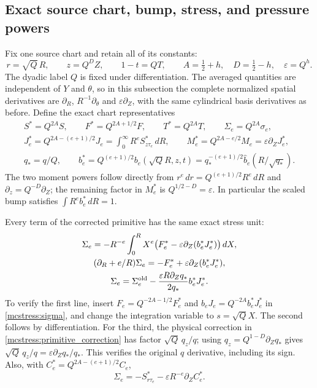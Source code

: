 \documentclass[11pt]{article}
\begin{document}
\subsection{Exact source chart, bump, stress, and pressure powers}

Fix one source chart and retain all of its constants:
\begin{equation}\label{mcstress:chart}
 r=\sqrt Q\,R,\qquad z=Q^D Z,\qquad1-t=QT,
 \qquad A=\tfrac12+h,\quad D=\tfrac12-h,\quad
 \varepsilon=Q^h.
\end{equation}
The dyadic label $Q$ is fixed under differentiation. The averaged quantities
are independent of $Y$ and $\theta$, so in this
subsection the complete normalized spatial derivatives are
$\partial_R$, $R^{-1}\partial_\theta$ and $\varepsilon\partial_Z$,
with the same cylindrical basis derivatives as before.
Define the exact chart representatives
\begin{equation}\label{mcstress:chart_representatives}
\begin{gathered}
 S^*=Q^{2A}S,\qquad F^*=Q^{2A+1/2}F,\qquad
 T^*=Q^{2A}T,\qquad \Sigma_e=Q^{2A}\sigma_e,\\
 J_e^*=Q^{2A-(e+1)/2}J_e
             =\int_0^\infty R^e S^*_{z\tau_e}\,dR,\qquad
 M_e^*=Q^{2A-e/2}M_e=\varepsilon\partial_ZJ_e^*,\\
 q_*=q/Q,\qquad
 b_e^*=Q^{(e+1)/2}b_e(\sqrt Q R,z,t)
       =q_*^{-(e+1)/2}\widehat b_e(R/\sqrt{q_*}).
\end{gathered}
\end{equation}
The two moment powers follow directly from
$r^e\,dr=Q^{(e+1)/2}R^e\,dR$ and
$\partial_z=Q^{-D}\partial_Z$; the remaining factor in $M_e^*$
is $Q^{1/2-D}=\varepsilon$. In particular the scaled bump satisfies
$\int R^e b_e^*\,dR=1$.

Every term of the corrected primitive has the same exact stress unit:
\begin{equation}\label{mcstress:chart_sigma}
\begin{gathered}
 \Sigma_e=-R^{-e}\int_0^R X^e
             \bigl(F_e^*-\varepsilon\partial_Z(b_e^*J_e^*)\bigr)\,dX,\\
 (\partial_R+e/R)\Sigma_e
       =-F_e^*+\varepsilon\partial_Z(b_e^*J_e^*),\\
 \Sigma_e=\Sigma_e^{\rm old}
       -\frac{\varepsilon R\partial_Zq_*}{2q_*}b_e^*J_e^*.
\end{gathered}
\end{equation}
To verify the first line, insert
$F_e=Q^{-2A-1/2}F_e^*$ and $b_eJ_e=Q^{-2A}b_e^*J_e^*$ in
\eqref{mcstress:sigma}, and change the integration variable to
$s=\sqrt Q X$. The second follows by differentiation. For the third,
the physical correction in \eqref{mcstress:primitive_correction}
has factor $\sqrt Q\,q_z/q$; using
$q_z=Q^{1-D}\partial_Zq_*$ gives
$\sqrt Q\,q_z/q=\varepsilon\partial_Zq_*/q_*$.
This verifies the original $q$ derivative, including its sign.
Also, with $C_e^*=Q^{2A-(e+1)/2}C_e$,
\[
 \Sigma_e=-S^*_{r\tau_e}
                     -\varepsilon R^{-e}\partial_Z C_e^*.
\]
\end{document}
